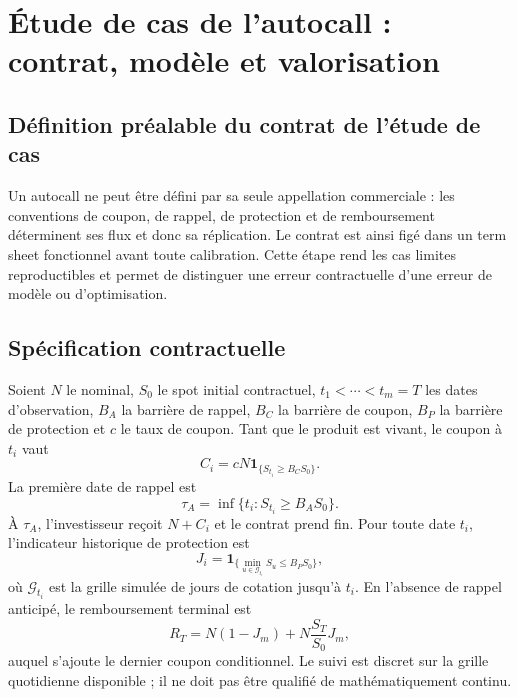 \documentclass[12pt,a4paper]{article}
\newcommand{\1}{\mathbf{1}}
\begin{document}
\section{Étude de cas de l'autocall : contrat, modèle et valorisation}

\subsection{Définition préalable du contrat de l'étude de cas}

Un autocall ne peut être défini par sa seule appellation commerciale : les
conventions de coupon, de rappel, de protection et de remboursement déterminent
ses flux et donc sa réplication. Le contrat est ainsi figé dans un term sheet
fonctionnel avant toute calibration. Cette étape rend les cas limites
reproductibles et permet de distinguer une erreur contractuelle d'une erreur de
modèle ou d'optimisation.

\subsection{Spécification contractuelle}

Soient $N$ le nominal, $S_0$ le spot initial contractuel, $t_1<\cdots<t_m=T$ les dates d'observation, $B_A$ la barrière de rappel, $B_C$ la barrière de coupon, $B_P$ la barrière de protection et $c$ le taux de coupon. Tant que le produit est vivant, le coupon à $t_i$ vaut
\begin{equation}
 C_i=cN\1_{\{S_{t_i}\geq B_CS_0\}}.
\label{eq:coupon}
\end{equation}
La première date de rappel est
\begin{equation}
 \tau_A=\inf\{t_i:S_{t_i}\geq B_AS_0\}.
\label{eq:first-call}
\end{equation}
À $\tau_A$, l'investisseur reçoit $N+C_i$ et le contrat prend fin. Pour toute
date $t_i$, l'indicateur historique de protection est
\begin{equation}
 J_i=\1_{\{\min_{u\in\mathcal G_{t_i}}S_u\leq B_PS_0\}},
\label{eq:barrier-state}
\end{equation}
où $\mathcal G_{t_i}$ est la grille simulée de jours de cotation jusqu'à $t_i$.
En l'absence de rappel anticipé, le remboursement terminal est
\begin{equation}
 R_T=N(1-J_m)+N\frac{S_T}{S_0}J_m,
\label{eq:terminal-redemption}
\end{equation}
auquel s'ajoute le dernier coupon conditionnel. Le suivi est discret sur la grille quotidienne disponible ; il ne doit pas être qualifié de mathématiquement continu.
\end{document}
